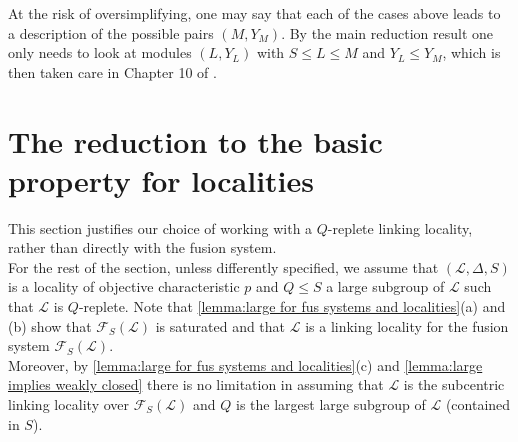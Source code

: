\documentclass{amsart}
\numberwithin{equation}{section}
\theoremstyle{definition}
\theoremstyle{subresult}
\theoremstyle{caseresult}
\newcommand{\F}{\mathcal{F}}
\renewcommand{\L}{\mathcal{L}}
\newcommand{\<}{\langle}
\renewcommand{\>}{\rangle}
\begin{document}
At the risk of oversimplifying, one may say that each of the cases above leads to a description of the possible pairs $(M,Y_M)$. By the main reduction result one only needs to look at modules $(L,Y_L)$ with $S \le L \le M$ and $Y_L \le Y_M$, which is then taken care in Chapter 10 of \cite{Meier-Stell-Stroth:2012}.



\section{The reduction to the basic property for localities}
\label{basic property in localit}

This section justifies our choice of working with a $Q$-replete linking locality, rather than directly with the fusion system.\\

For the rest of the section, unless differently specified, we assume that $(\L,\Delta,S)$ is a locality of objective characteristic $p$ and $Q \le S$ a large subgroup of $\L$ such that $\L$ is $Q$-replete. Note that \ref{lemma:large for fus systems and localities}(a) and (b) show that $\F_S(\L)$ is saturated and that $\L$ is a linking locality for the fusion system $\F_S(\L)$.\\
Moreover, by \ref{lemma:large for fus systems and localities}(c) and \ref{lemma:large implies weakly closed} there is no limitation in assuming that $\L$ is the subcentric linking locality over $\F_S(\L)$ and $Q$ is the largest large subgroup of $\L$ (contained in $S$).
\end{document}
